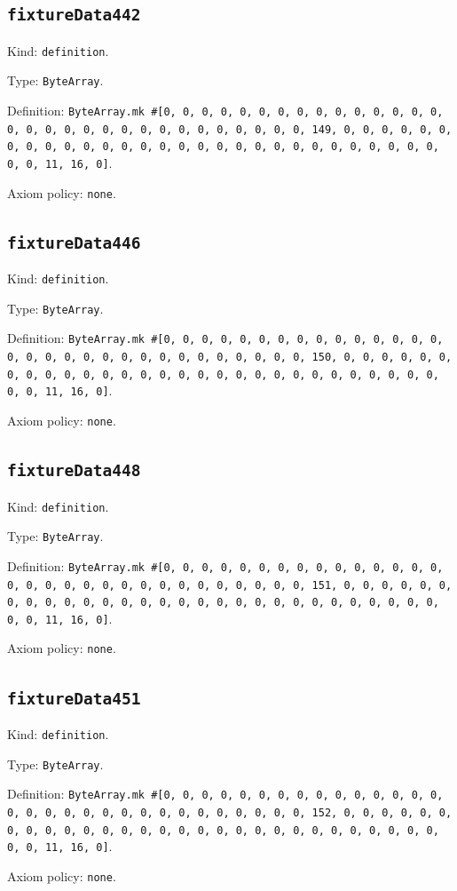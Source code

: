 \documentclass[11pt]{article}
\begin{document}
\subsection*{\texttt{fixtureData442}}
\noindent Kind: \texttt{definition}.\par
\noindent Type: \texttt{ByteArray}.\par
\noindent Definition: \texttt{ByteArray.mk \#[0, 0, 0, 0, 0, 0, 0, 0, 0, 0, 0, 0, 0, 0, 0, 0, 0, 0, 0, 0, 0, 0, 0, 0, 0, 0, 0, 0, 0, 0, 0, 149, 0, 0, 0, 0, 0, 0, 0, 0, 0, 0, 0, 0, 0, 0, 0, 0, 0, 0, 0, 0, 0, 0, 0, 0, 0, 0, 0, 0, 0, 0, 0, 11, 16, 0]}.\par
\noindent Axiom policy: \texttt{none}.\par
\subsection*{\texttt{fixtureData446}}
\noindent Kind: \texttt{definition}.\par
\noindent Type: \texttt{ByteArray}.\par
\noindent Definition: \texttt{ByteArray.mk \#[0, 0, 0, 0, 0, 0, 0, 0, 0, 0, 0, 0, 0, 0, 0, 0, 0, 0, 0, 0, 0, 0, 0, 0, 0, 0, 0, 0, 0, 0, 0, 150, 0, 0, 0, 0, 0, 0, 0, 0, 0, 0, 0, 0, 0, 0, 0, 0, 0, 0, 0, 0, 0, 0, 0, 0, 0, 0, 0, 0, 0, 0, 0, 11, 16, 0]}.\par
\noindent Axiom policy: \texttt{none}.\par
\subsection*{\texttt{fixtureData448}}
\noindent Kind: \texttt{definition}.\par
\noindent Type: \texttt{ByteArray}.\par
\noindent Definition: \texttt{ByteArray.mk \#[0, 0, 0, 0, 0, 0, 0, 0, 0, 0, 0, 0, 0, 0, 0, 0, 0, 0, 0, 0, 0, 0, 0, 0, 0, 0, 0, 0, 0, 0, 0, 151, 0, 0, 0, 0, 0, 0, 0, 0, 0, 0, 0, 0, 0, 0, 0, 0, 0, 0, 0, 0, 0, 0, 0, 0, 0, 0, 0, 0, 0, 0, 0, 11, 16, 0]}.\par
\noindent Axiom policy: \texttt{none}.\par
\subsection*{\texttt{fixtureData451}}
\noindent Kind: \texttt{definition}.\par
\noindent Type: \texttt{ByteArray}.\par
\noindent Definition: \texttt{ByteArray.mk \#[0, 0, 0, 0, 0, 0, 0, 0, 0, 0, 0, 0, 0, 0, 0, 0, 0, 0, 0, 0, 0, 0, 0, 0, 0, 0, 0, 0, 0, 0, 0, 152, 0, 0, 0, 0, 0, 0, 0, 0, 0, 0, 0, 0, 0, 0, 0, 0, 0, 0, 0, 0, 0, 0, 0, 0, 0, 0, 0, 0, 0, 0, 0, 11, 16, 0]}.\par
\noindent Axiom policy: \texttt{none}.\par
\end{document}
